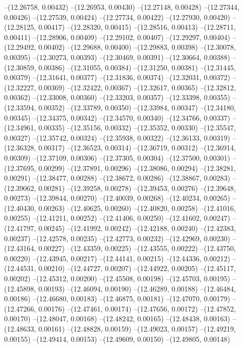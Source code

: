 --(12.26758, 0.00432)
--(12.26953, 0.00430)
--(12.27148, 0.00428)
--(12.27344, 0.00426)
--(12.27539, 0.00424)
--(12.27734, 0.00422)
--(12.27930, 0.00420)
--(12.28125, 0.00417)
--(12.28320, 0.00415)
--(12.28516, 0.00413)
--(12.28711, 0.00411)
--(12.28906, 0.00409)
--(12.29102, 0.00407)
--(12.29297, 0.00404)
--(12.29492, 0.00402)
--(12.29688, 0.00400)
--(12.29883, 0.00398)
--(12.30078, 0.00395)
--(12.30273, 0.00393)
--(12.30469, 0.00391)
--(12.30664, 0.00388)
--(12.30859, 0.00386)
--(12.31055, 0.00384)
--(12.31250, 0.00381)
--(12.31445, 0.00379)
--(12.31641, 0.00377)
--(12.31836, 0.00374)
--(12.32031, 0.00372)
--(12.32227, 0.00369)
--(12.32422, 0.00367)
--(12.32617, 0.00365)
--(12.32812, 0.00362)
--(12.33008, 0.00360)
--(12.33203, 0.00357)
--(12.33398, 0.00355)
--(12.33594, 0.00352)
--(12.33789, 0.00350)
--(12.33984, 0.00347)
--(12.34180, 0.00345)
--(12.34375, 0.00342)
--(12.34570, 0.00340)
--(12.34766, 0.00337)
--(12.34961, 0.00335)
--(12.35156, 0.00332)
--(12.35352, 0.00330)
--(12.35547, 0.00327)
--(12.35742, 0.00324)
--(12.35938, 0.00322)
--(12.36133, 0.00319)
--(12.36328, 0.00317)
--(12.36523, 0.00314)
--(12.36719, 0.00312)
--(12.36914, 0.00309)
--(12.37109, 0.00306)
--(12.37305, 0.00304)
--(12.37500, 0.00301)
--(12.37695, 0.00299)
--(12.37891, 0.00296)
--(12.38086, 0.00294)
--(12.38281, 0.00291)
--(12.38477, 0.00288)
--(12.38672, 0.00286)
--(12.38867, 0.00283)
--(12.39062, 0.00281)
--(12.39258, 0.00278)
--(12.39453, 0.00276)
--(12.39648, 0.00273)
--(12.39844, 0.00270)
--(12.40039, 0.00268)
--(12.40234, 0.00265)
--(12.40430, 0.00263)
--(12.40625, 0.00260)
--(12.40820, 0.00258)
--(12.41016, 0.00255)
--(12.41211, 0.00252)
--(12.41406, 0.00250)
--(12.41602, 0.00247)
--(12.41797, 0.00245)
--(12.41992, 0.00242)
--(12.42188, 0.00240)
--(12.42383, 0.00237)
--(12.42578, 0.00235)
--(12.42773, 0.00232)
--(12.42969, 0.00230)
--(12.43164, 0.00227)
--(12.43359, 0.00225)
--(12.43555, 0.00222)
--(12.43750, 0.00220)
--(12.43945, 0.00217)
--(12.44141, 0.00215)
--(12.44336, 0.00212)
--(12.44531, 0.00210)
--(12.44727, 0.00207)
--(12.44922, 0.00205)
--(12.45117, 0.00202)
--(12.45312, 0.00200)
--(12.45508, 0.00198)
--(12.45703, 0.00195)
--(12.45898, 0.00193)
--(12.46094, 0.00190)
--(12.46289, 0.00188)
--(12.46484, 0.00186)
--(12.46680, 0.00183)
--(12.46875, 0.00181)
--(12.47070, 0.00179)
--(12.47266, 0.00176)
--(12.47461, 0.00174)
--(12.47656, 0.00172)
--(12.47852, 0.00170)
--(12.48047, 0.00168)
--(12.48242, 0.00165)
--(12.48438, 0.00163)
--(12.48633, 0.00161)
--(12.48828, 0.00159)
--(12.49023, 0.00157)
--(12.49219, 0.00155)
--(12.49414, 0.00153)
--(12.49609, 0.00150)
--(12.49805, 0.00148)
